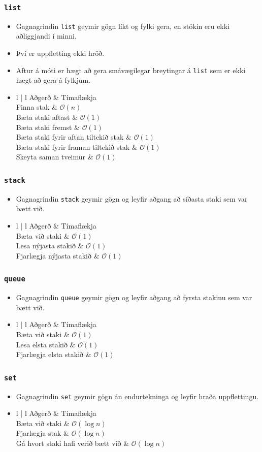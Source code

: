 \documentclass[handout]{beamer}
\newcommand\env[2]
{
	\begin{#1}
	#2
	\end{#1}
}
\begin{document}
\env{frame}
{
	\frametitle{\texttt{list}}
	\env{itemize}
	{
		\item<1-> Gagnagrindin \texttt{list} geymir gögn líkt og fylki gera, en stökin eru ekki aðliggjandi í minni.
		\item<2-> Því er uppfletting ekki hröð.
		\item<3-> Aftur á móti er hægt að gera smávægilegar breytingar á \texttt{list} sem er ekki hægt að gera á fylkjum.
		\item<4->
		\env{tabular}
		{
			{l | l}
			Aðgerð & Tímaflækja\\
			\hline
			Finna stak & $\mathcal{O}(n)$\\
			Bæta staki aftast & $\mathcal{O}(1)$\\
			Bæta staki fremst & $\mathcal{O}(1)$\\
			Bæta staki fyrir aftan tiltekið stak & $\mathcal{O}(1)$\\
			Bæta staki fyrir framan tiltekið stak & $\mathcal{O}(1)$\\
			Skeyta saman tveimur & $\mathcal{O}(1)$\\
		}
	}
}

\env{frame}
{
	\frametitle{\texttt{stack}}
	\env{itemize}
	{
		\item<1-> Gagnagrindin \texttt{stack} geymir gögn og leyfir aðgang að síðasta staki sem var bætt við.
		\item<2->
		\env{tabular}
		{
			{l | l}
			Aðgerð & Tímaflækja\\
			\hline
			Bæta við staki & $\mathcal{O}(1)$\\
			Lesa nýjasta stakið & $\mathcal{O}(1)$\\
			Fjarlægja nýjasta stakið  & $\mathcal{O}(1)$\\
		}
	}
}

\env{frame}
{
	\frametitle{\texttt{queue}}
	\env{itemize}
	{
		\item<1-> Gagnagrindin \texttt{queue} geymir gögn og leyfir aðgang að fyrsta stakinu sem var bætt við.
		\item<2->
		\env{tabular}
		{
			{l | l}
			Aðgerð & Tímaflækja\\
			\hline
			Bæta við staki & $\mathcal{O}(1)$\\
			Lesa elsta stakið & $\mathcal{O}(1)$\\
			Fjarlægja elsta stakið  & $\mathcal{O}(1)$\\
		}
	}
}

\env{frame}
{
	\frametitle{\texttt{set}}
	\env{itemize}
	{
		\item<1-> Gagnagrindin \texttt{set} geymir gögn án endurtekninga og leyfir hraða uppflettingu.
		\item<2->
		\env{tabular}
		{
			{l | l}
			Aðgerð & Tímaflækja\\
			\hline
			Bæta við staki & $\mathcal{O}(\log n)$\\
			Fjarlægja stak & $\mathcal{O}(\log n)$\\
			Gá hvort staki hafi verið bætt við  & $\mathcal{O}(\log n)$\\
		}
	}
}
\end{document}

